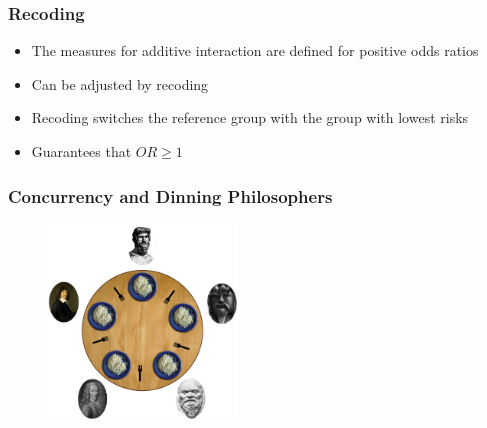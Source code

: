 \documentclass{beamer}
\begin{document}

 


\begin{frame}
\frametitle{Recoding}

\begin{itemize}
 \item The measures for additive interaction are defined for positive odds ratios
 \item Can be adjusted by recoding
 \item Recoding switches the reference group with the group with lowest risks
 \item Guarantees that $OR \geq 1$
\end{itemize}

\end{frame}



\begin{frame}
\frametitle{Concurrency and Dinning Philosophers}

\begin{figure}[h]
    \centering
    \includegraphics[width=5cm]{../dining_philosophers.png}
\end{figure}

\end{frame}
\end{document}

